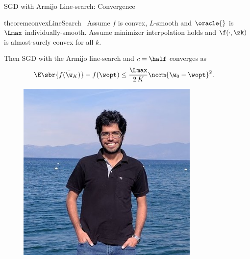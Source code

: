 \documentclass[mathserif,notheorems, hyperref={colorlinks, citecolor=blue, urlcolor=blue, linkcolor=blue}]{beamer}
\def\\{}%
\begin{document}
    \begin{frame}{SGD with Armijo Line-search: Convergence}
        \vspace{-2ex}
        \begin{minipage}[t]{0.82\textwidth}
            \vspace{-1.45ex} 
            \begin{restatable}{theorem}{convexLineSearch}~\label{thm:convex-line-search}
                Assume \( f \) is convex, \( L \)-smooth and \( \oracle{} \) is \( \Lmax \) individually-smooth.
                Assume minimizer interpolation holds and \( \f(\cdot, \zk) \) is almost-surely convex for all \( k \).\\

                Then SGD with the Armijo line-search and \( c = \half \) converges as 
                \begin{align*}
                    \E\sbr{f(\bar \w_K)} - f(\wopt) &\leq \frac{\Lmax}{2 \, K} \norm{\w_0 - \wopt}^2.
                \end{align*} 
            \end{restatable}
        \end{minipage}
        \begin{minipage}[t]{0.15\textwidth}
            \begin{figure}
                    \centering
                    \includegraphics[width=0.8\textwidth]{collaborators/sharan}

                    \vspace{0.5ex}


\end{figure}
\end{minipage}
\end{frame}
\end{document}
